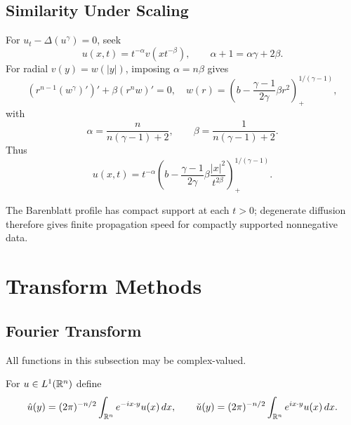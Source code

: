 \subsection{Similarity Under Scaling}
\label{sec:similarity-under-scaling}

\begin{example}
\label{ex:porous-medium-scaling-invariant-barenblatt}

For $u_t-\Delta(u^\gamma)=0$, seek
\[
u(x,t)=t^{-\alpha}v(xt^{-\beta}),\qquad \alpha+1=\alpha\gamma+2\beta.
\]
For radial $v(y)=w(|y|)$, imposing $\alpha=n\beta$ gives
\[
(r^{n-1}(w^\gamma)')'+\beta(r^nw)'=0,
\quad
w(r)=\left(b-\frac{\gamma-1}{2\gamma}\beta r^2\right)_+^{1/(\gamma-1)},
\]
with
\[
\alpha=\frac n{n(\gamma-1)+2},\qquad
\beta=\frac1{n(\gamma-1)+2}.
\]
Thus
\[
u(x,t)=t^{-\alpha}\left(b-\frac{\gamma-1}{2\gamma}\beta\frac{|x|^2}{t^{2\beta}}\right)_+^{1/(\gamma-1)}.
\]
\end{example}

\begin{remark}
\label{rem:porous-medium-finite-propagation-speed}

The Barenblatt profile has compact support at each $t>0$; degenerate diffusion
therefore gives finite propagation speed for compactly supported nonnegative
data.
\end{remark}

\section{Transform Methods}
\label{sec:transform-methods}

\subsection{Fourier Transform}
\label{sec:fourier-transform}

All functions in this subsection may be complex-valued.

\begin{definition}
\label{def:fourier-transform-l1}
For $u\in L^1(\mathbb{R}^n)$ define
\[
\hat u(y)=(2\pi)^{-n/2}\int_{\mathbb{R}^n}e^{-ix\cdot y}u(x)\,dx,
\qquad
\check u(y)=(2\pi)^{-n/2}\int_{\mathbb{R}^n}e^{ix\cdot y}u(x)\,dx.
\]
\end{definition}

